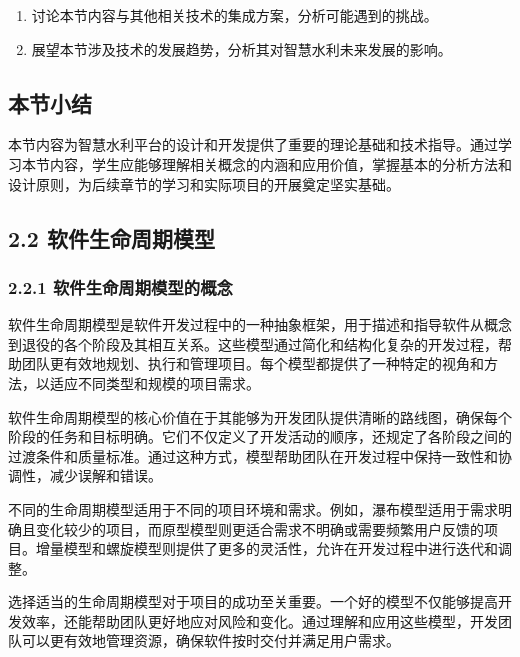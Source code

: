 \begin{enumerate}
\def\labelenumi{\arabic{enumi}.}
\tightlist
\item
  讨论本节内容与其他相关技术的集成方案，分析可能遇到的挑战。
\item
  展望本节涉及技术的发展趋势，分析其对智慧水利未来发展的影响。
\end{enumerate}

\hypertarget{ux672cux8282ux5c0fux7ed3}{%
\subsection{本节小结}\label{ux672cux8282ux5c0fux7ed3}}

本节内容为智慧水利平台的设计和开发提供了重要的理论基础和技术指导。通过学习本节内容，学生应能够理解相关概念的内涵和应用价值，掌握基本的分析方法和设计原则，为后续章节的学习和实际项目的开展奠定坚实基础。

\hypertarget{ux8f6fux4ef6ux751fux547dux5468ux671fux6a21ux578b}{%
\subsection{2.2 软件生命周期模型}\label{ux8f6fux4ef6ux751fux547dux5468ux671fux6a21ux578b}}

\hypertarget{ux8f6fux4ef6ux751fux547dux5468ux671fux6a21ux578bux7684ux6982ux5ff5}{%
\subsubsection{2.2.1 软件生命周期模型的概念}\label{ux8f6fux4ef6ux751fux547dux5468ux671fux6a21ux578bux7684ux6982ux5ff5}}

软件生命周期模型是软件开发过程中的一种抽象框架，用于描述和指导软件从概念到退役的各个阶段及其相互关系。这些模型通过简化和结构化复杂的开发过程，帮助团队更有效地规划、执行和管理项目。每个模型都提供了一种特定的视角和方法，以适应不同类型和规模的项目需求。

软件生命周期模型的核心价值在于其能够为开发团队提供清晰的路线图，确保每个阶段的任务和目标明确。它们不仅定义了开发活动的顺序，还规定了各阶段之间的过渡条件和质量标准。通过这种方式，模型帮助团队在开发过程中保持一致性和协调性，减少误解和错误。

不同的生命周期模型适用于不同的项目环境和需求。例如，瀑布模型适用于需求明确且变化较少的项目，而原型模型则更适合需求不明确或需要频繁用户反馈的项目。增量模型和螺旋模型则提供了更多的灵活性，允许在开发过程中进行迭代和调整。

选择适当的生命周期模型对于项目的成功至关重要。一个好的模型不仅能够提高开发效率，还能帮助团队更好地应对风险和变化。通过理解和应用这些模型，开发团队可以更有效地管理资源，确保软件按时交付并满足用户需求。

